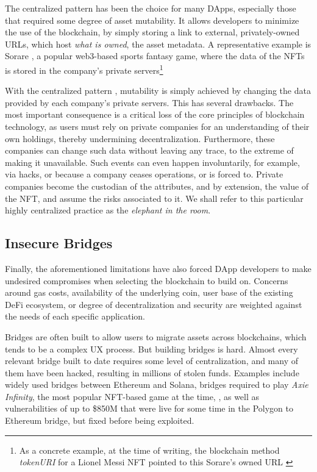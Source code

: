 The centralized pattern  has been the choice for many DApps,
especially those that required some degree of asset mutability.
It allows developers to minimize the use
of the blockchain, by simply storing a link to external, privately-owned URLs, which
host {\it what is owned}, the asset metadata. A representative example 
is Sorare \cite{sorare},
a popular web3-based sports fantasy game, where the data of the NFTs
is stored in the company's private servers\footnote{As a concrete example, at the time of writing,
the blockchain method {\it tokenURI} for a Lionel Messi NFT \cite{messiOpenSea} pointed to
this Sorare's owned URL \cite{messiOnSorare}}

With the centralized pattern , mutability is simply achieved by changing the data
provided by each company's private servers. This has several drawbacks. The most important
consequence is a critical loss of the core principles
of blockchain technology, as users must rely on private companies
for an understanding of their own holdings, thereby undermining decentralization.
Furthermore, these companies can change such data without leaving any trace, to the extreme 
of making it unavailable. Such events can even happen involuntarily, for example, 
via hacks, or because a company ceases operations, or is forced to. 
Private companies become the custodian of the attributes, and by extension,
the value of the NFT, and assume the risks associated to it. 
We shall refer to this particular highly centralized practice as the {\it elephant in the room}.

\subsection{Insecure Bridges}\label{bridges}

Finally, the aforementioned limitations have also forced DApp developers 
to make undesired compromises when selecting the blockchain to build on.
Concerns around gas costs, availability of the underlying coin, user base 
of the existing DeFi ecosystem, or degree of decentralization and
security are weighted against the needs of each specific application.

Bridges are often built to allow users to migrate assets across blockchains,
which tends to be a complex UX process.
But building bridges is hard. Almost every relevant
bridge built to date requires some level of centralization,
and many of them have been hacked\cite{lee2022sok},
resulting in millions of stolen funds. Examples include
widely used bridges between Ethereum and Solana\cite{eth-solana},
bridges required to play {\it Axie Infinity},
the most popular NFT-based game at the time\cite{axie-bridge-1}, \cite{axie-bridge-2},
as well as vulnerabilities of up to \$850M that 
were live for some time in the Polygon to Ethereum bridge,
but fixed before being exploited\cite{polygon-hack}.


